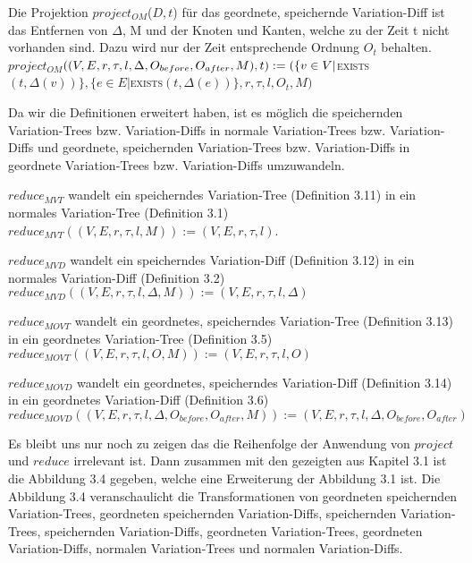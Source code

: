 \begin{definition}
	Die Projektion $project_{OM}$($D,t$) für das geordnete, speichernde Variation-Diff ist das Entfernen von $\Delta$, M und der Knoten und Kanten, welche zu der Zeit t nicht vorhanden sind. Dazu wird nur der Zeit entsprechende Ordnung $O_t$ behalten.\\ $project_{OM}$$((V,E,r,\tau,l,\Delta,O_{before},O_{after},M),t)\\ := (\{v \in V | $\textsc{exists}$(t,\Delta(v))\},\{e \in E | $\textsc{exists}$(t,\Delta(e))\},r,\tau,l,O_t,M)$
\end{definition}
Da wir die Definitionen erweitert haben, ist es  möglich die speichernden Variation-Trees bzw. Variation-Diffs in normale Variation-Trees bzw. Variation-Diffs und geordnete, speichernden Variation-Trees bzw. Variation-Diffs in geordnete Variation-Trees bzw. Variation-Diffs umzuwandeln. 
\begin{definition}
	$reduce_{MVT}$ wandelt ein speicherndes Variation-Tree (Definition 3.11) in ein normales Variation-Tree (Definition 3.1) \\
	$reduce_{MVT}((V,E,r,\tau,l,M)) := (V,E,r,\tau,l)$.
\end{definition}
\begin{definition}
	$reduce_{MVD}$ wandelt ein speicherndes Variation-Diff (Definition 3.12) in ein normales Variation-Diff (Definition 3.2) \\
	$reduce_{MVD}((V,E,r,\tau,l,\Delta,M)) := (V,E,r,\tau,l,\Delta)$
\end{definition}
\begin{definition}
	$reduce_{MOVT}$ wandelt ein geordnetes, speicherndes Variation-Tree (Definition 3.13) in ein geordnetes Variation-Tree (Definition 3.5) \\
	$reduce_{MOVT}((V,E,r,\tau,l,O,M)) := (V,E,r,\tau,l,O)$
\end{definition}
\begin{definition}
	$reduce_{MOVD}$ wandelt ein geordnetes, speicherndes Variation-Diff (Definition 3.14) in ein geordnetes Variation-Diff (Definition 3.6) \\
	$reduce_{MOVD}((V,E,r,\tau,l,\Delta,O_{before},O_{after},M)) := (V,E,r,\tau,l,\Delta,O_{before},O_{after})$
\end{definition}
Es bleibt uns nur noch zu zeigen das die Reihenfolge der Anwendung von $project$ und $reduce$ irrelevant ist. Dann zusammen mit den gezeigten aus Kapitel 3.1 ist die Abbildung 3.4 gegeben, welche eine Erweiterung der Abbildung 3.1 ist. Die Abbildung 3.4 veranschaulicht die Transformationen von geordneten speichernden Variation-Trees, geordneten speichernden Variation-Diffs,  speichernden Variation-Trees, speichernden Variation-Diffs, geordneten Variation-Trees, geordneten Variation-Diffs, normalen Variation-Trees und normalen Variation-Diffs.
